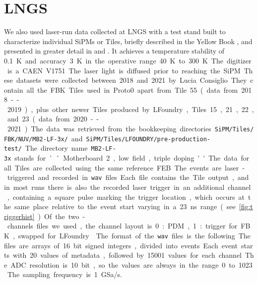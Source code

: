 
\clearpage
\section{LNGS}
\label{sec:lngsdata}


We also used laser-run data collected at LNGS with a test stand built to
characterize individual SiPMs or Tiles, briefly described in the Yellow Book
\cite[34]{aalseth2018}, and presented in greater detail in \cite{acerbi2017}
and \cite[ch.~3]{savarese2018}. It achieves a temperature stability of
\SI{0.1}K and accuracy \SI{3}{K} in the operative range \SI{40}{K} to
\SI{300}{K}. The digitizer is a CAEN V1751. The laser light is diffused prior
to reaching the SiPM.

These datasets were collected between 2018 and 2021 by Lucia Consiglio. They
contain all the FBK Tiles used in Proto0 apart from Tile~55 (data from
2018--2019), plus other newer Tiles produced by LFoundry, Tiles~15, 21, 22,
and~23 (data from 2020--2021). The data was retrieved from the bookkeeping
directories \nolinkurl{SiPM/Tiles/FBK/NUV/MB2-LF-3x/} and
\nolinkurl{SiPM/Tiles/LFOUNDRY/pre-production-test/}. The directory name
\nolinkurl{MB2-LF-3x} stands for ``Motherboard 2, low field, triple doping''.
The data for all Tiles are collected using the same reference FEB.

The events are laser-triggered and recorded in \texttt{wav} files. Each file
contains the Tile output, and in most runs there is also the recorded laser
trigger in an additional channel, containing a square pulse marking the trigger
location, which occurs at the same place relative to the event start varying in
a \SI{23}{ns} range (see \autoref{fig:triggerhist}). Of the two-channels files
we used, the channel layout is 0:PDM, 1:trigger for FBK, swapped for LFoundry.


The format of the \texttt{wav} files is the following. The files are arrays of
16~bit signed integers, divided into events. Each event starts with 20 values
of metadata, followed by \num{15001} values for each channel. The ADC
resolution is 10~bit, so the values are always in the range 0 to~1023. The
sampling frequency is \SI{1}{GSa/s}.

